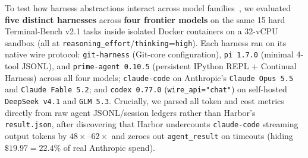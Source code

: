 \documentclass[11pt]{article}
\begin{document}
To test how harness abstractions interact across model families~\citep{zhang2026disclose,guo2026survey}, we evaluated \textbf{five distinct harnesses} across \textbf{four frontier models} on the same 15 hard Terminal-Bench v2.1 tasks inside isolated Docker containers on a 32-vCPU sandbox (all at \texttt{reasoning\_effort}/\texttt{thinking}=\texttt{high}).
Each harness ran on its native wire protocol: \texttt{git-harness} (Git-core configuration), \texttt{pi 1.7.0} (minimal 4-tool JSONL), and \texttt{prime-agent 0.10.5} (persistent IPython REPL + Continual Harness) across all four models; \texttt{claude-code} on Anthropic's \texttt{Claude Opus 5.5} and \texttt{Claude Fable 5.2}; and \texttt{codex 0.77.0} (\texttt{wire\_api="chat"}) on self-hosted \texttt{DeepSeek v4.1} and \texttt{GLM 5.3}.
Crucially, we parsed all token and cost metrics directly from raw agent JSONL/session ledgers rather than Harbor's \texttt{result.json}, after discovering that Harbor undercounts \texttt{claude-code} streaming output tokens by $48\times\text{--}62\times$ and zeroes out \texttt{agent\_result} on timeouts (hiding $\$19.97 = 22.4\%$ of real Anthropic spend).
\end{document}
